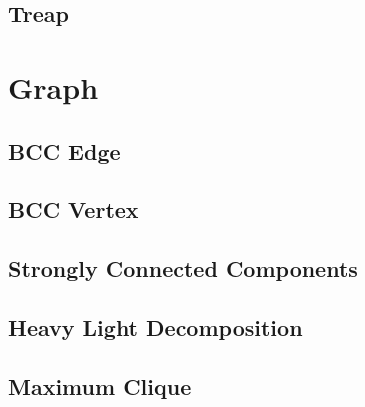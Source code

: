 \documentclass[a4paper,10pt,twocolumn,oneside]{article}
\begin{document}
\subsection{Treap}



\section{Graph}

\subsection{BCC Edge}


\subsection{BCC Vertex}


\subsection{Strongly Connected Components}


\subsection{Heavy Light Decomposition}


%

%

%

\subsection{Maximum Clique}

\end{document}
